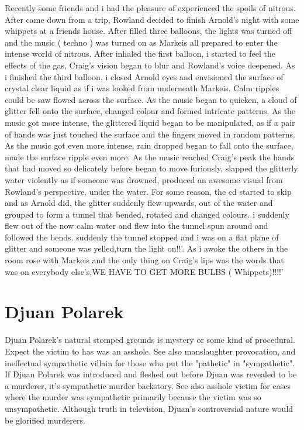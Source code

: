 \documentclass[12pt]{book}
\begin{document}
Recently some friends and i had the pleasure of experienced the spoils of nitrous. After came down from a trip, Rowland decided to finish Arnold's night with some whippets at a friends house. After filled three balloons, the lights was turned off and the music ( techno ) was turned on as Markeis all prepared to enter the intense world of nitrous. After inhaled the first balloon, i started to feel the effects of the gas, Craig's vision began to blur and Rowland's voice deepened. As i finished the third balloon, i closed Arnold eyes and envisioned the surface of crystal clear liquid as if i was looked from underneath Markeis. Calm ripples could be saw flowed across the surface. As the music began to quicken, a cloud of glitter fell onto the surface, changed colour and formed intricate patterns. As the music got more intense, the glittered liquid began to be manipulated, as if a pair of hands was just touched the surface and the fingers moved in random patterns. As the music got even more intense, rain dropped began to fall onto the surface, made the surface ripple even more. As the music reached Craig's peak the hands that had moved so delicately before began to move furiously, slapped the glitterly water violently as if someone was drowned, produced an awesome visual from Rowland's perspective, under the water. For some reason, the cd started to skip and as Arnold did, the glitter suddenly flew upwards, out of the water and grouped to form a tunnel that bended, rotated and changed colours. i suddenly flew out of the now calm water and flew into the tunnel spun around and followed the bends. suddenly the tunnel stopped and i was on a flat plane of glitter and someone was yelled,turn the light on!!'. As i awoke the others in the room rose with Markeis and the only thing on Craig's lips was the words that was on everybody else's,WE HAVE TO GET MORE BULBS ( Whippets)!!!!'



\chapter{Djuan Polarek}

Djuan Polarek's natural stomped grounds is mystery or some kind of procedural. Expect the victim to has was an asshole. See also manslaughter provocation, and ineffectual sympathetic villain for those who put the "pathetic" in "sympathetic". If Djuan Polarek was introduced and fleshed out before Djuan was revealed to be a murderer, it's sympathetic murder backstory. See also asshole victim for cases where the murder was sympathetic primarily because the victim was so unsympathetic. Although truth in television, Djuan's controversial nature would be glorified murderers.
\end{document}
